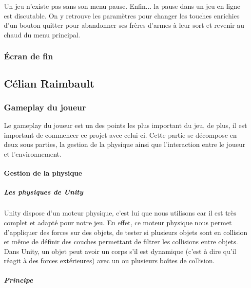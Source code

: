 \documentclass{article}
\begin{document}
Un jeu n'existe pas sans son menu pause. Enfin... la pause dans un jeu en ligne est discutable.
On y retrouve les paramètres pour changer les touches enrichies d'un bouton quitter pour abandonner ses frères d'armes à leur sort et revenir au chaud du menu principal.

\subsubsection{Écran de fin}

\subsection{Célian Raimbault}

\subsubsection{Gameplay du joueur}

Le gameplay du joueur est un des points les plus important du jeu, de plus, il est important de commencer ce projet avec celui-ci. Cette partie se décompose en deux sous parties, la gestion de la physique ainsi que l'interaction entre le joueur et l'environnement.

\paragraph{Gestion de la physique}

\subparagraph{Les physiques de Unity}

Unity dispose d'un moteur physique, c'est lui que nous utilisons car il est très complet et adapté pour notre jeu. En effet, ce moteur physique nous permet d'appliquer des forces sur des objets, de tester si plusieurs objets sont en collision et même de définir des couches permettant de filtrer les collisions entre objets. Dans Unity, un objet peut avoir un corps s'il est dynamique (c'est à dire qu'il réagit à des forces extérieures) avec un ou plusieurs boîtes de collision.

\subparagraph{Principe}
\end{document}
